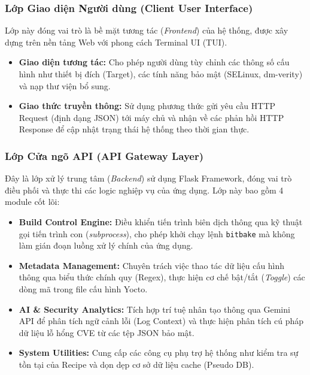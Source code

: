 \subsubsection{Lớp Giao diện Người dùng (Client User Interface)}

Lớp này đóng vai trò là bề mặt tương tác (\textit{Frontend}) của hệ thống, được xây dựng trên nền tảng Web với phong cách Terminal UI (TUI).

\begin{itemize}
    \item \textbf{Giao diện tương tác:} Cho phép người dùng tùy chỉnh các thông số cấu hình như thiết bị đích (Target), các tính năng bảo mật (SELinux, dm-verity) và nạp thư viện bổ sung.

    \item \textbf{Giao thức truyền thông:} Sử dụng phương thức gửi yêu cầu HTTP Request (định dạng JSON) tới máy chủ và nhận về các phản hồi HTTP Response để cập nhật trạng thái hệ thống theo thời gian thực.
\end{itemize}

\subsubsection{Lớp Cửa ngõ API (API Gateway Layer)}

Đây là lớp xử lý trung tâm (\textit{Backend}) sử dụng Flask Framework, đóng vai trò điều phối và thực thi các logic nghiệp vụ của ứng dụng. Lớp này bao gồm 4 module cốt lõi:

\begin{itemize}
    \item \textbf{Build Control Engine:} Điều khiển tiến trình biên dịch thông qua kỹ thuật gọi tiến trình con (\textit{subprocess}), cho phép khởi chạy lệnh \texttt{bitbake} mà không làm gián đoạn luồng xử lý chính của ứng dụng.

    \item \textbf{Metadata Management:} Chuyên trách việc thao tác dữ liệu cấu hình thông qua biểu thức chính quy (Regex), thực hiện cơ chế bật/tắt (\textit{Toggle}) các dòng mã trong file cấu hình Yocto.

    \item \textbf{AI \& Security Analytics:} Tích hợp trí tuệ nhân tạo thông qua Gemini API để phân tích ngữ cảnh lỗi (Log Context) và thực hiện phân tích cú pháp dữ liệu lỗ hổng CVE từ các tệp JSON bảo mật.

    \item \textbf{System Utilities:} Cung cấp các công cụ phụ trợ hệ thống như kiểm tra sự tồn tại của Recipe và dọn dẹp cơ sở dữ liệu cache (Pseudo DB).
\end{itemize}

